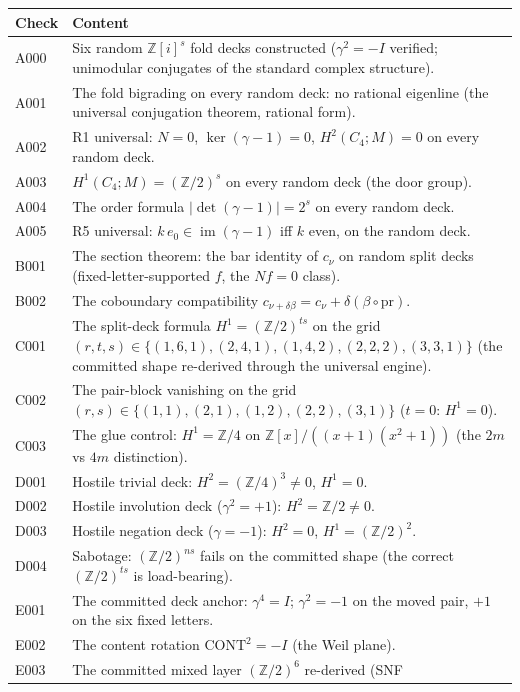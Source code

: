 \documentclass[11pt]{article}
\newcommand{\Img}{\operatorname{im}}
\newcommand{\Z}{\mathbb Z}
\begin{document}
\begin{longtable}{@{}p{1.1cm}p{13.5cm}@{}}
\toprule
\textbf{Check} & \textbf{Content} \\
\midrule
\endhead
A000 & Six random $\Z[i]^s$ fold decks constructed
($\gamma^2=-I$ verified; unimodular conjugates of the standard complex
structure). \\
A001 & The fold bigrading on every random deck: no rational eigenline
(the universal conjugation theorem, rational form). \\
A002 & R1 universal: $N=0$, $\ker(\gamma-1)=0$, $H^2(C_4;M)=0$ on
every random deck. \\
A003 & $H^1(C_4;M)=(\Z/2)^s$ on every random deck (the door group). \\
A004 & The order formula $|\det(\gamma-1)|=2^s$ on every random deck. \\
A005 & R5 universal: $k\,e_0\in\Img(\gamma-1)$ iff $k$ even, on the
random deck. \\
B001 & The section theorem: the bar identity of $c_\nu$ on random
split decks (fixed-letter-supported $f$, the $Nf=0$ class). \\
B002 & The coboundary compatibility
$c_{\nu+\delta\beta}=c_\nu+\delta(\beta\circ\mathrm{pr})$. \\
C001 & The split-deck formula $H^1=(\Z/2)^{ts}$ on the grid
$(r,t,s)\in\{(1,6,1),(2,4,1),(1,4,2),(2,2,2),(3,3,1)\}$ (the
committed shape re-derived through the universal engine). \\
C002 & The pair-block vanishing on the grid $(r,s)\in
\{(1,1),(2,1),(1,2),(2,2),(3,1)\}$ ($t=0$: $H^1=0$). \\
C003 & The glue control: $H^1=\Z/4$ on
$\Z[x]/((x+1)(x^2+1))$ (the $2m$ vs $4m$ distinction). \\
D001 & Hostile trivial deck: $H^2=(\Z/4)^3\ne0$, $H^1=0$. \\
D002 & Hostile involution deck ($\gamma^2=+1$): $H^2=\Z/2\ne0$. \\
D003 & Hostile negation deck ($\gamma=-1$): $H^2=0$,
$H^1=(\Z/2)^2$. \\
D004 & Sabotage: $(\Z/2)^{ns}$ fails on the committed shape (the
correct $(\Z/2)^{ts}$ is load-bearing). \\
E001 & The committed deck anchor: $\gamma^4=I$;
$\gamma^2=-1$ on the moved pair, $+1$ on the six fixed letters. \\
E002 & The content rotation $\mathrm{CONT}^2=-I$ (the Weil plane). \\
E003 & The committed mixed layer $(\Z/2)^6$ re-derived (SNF

\end{longtable}
\end{document}
